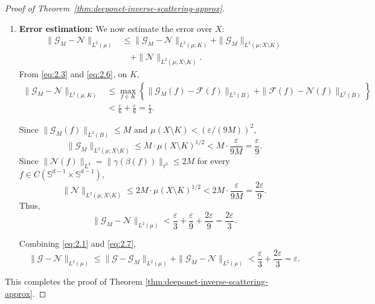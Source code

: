 \documentclass{article}
\numberwithin{equation}{section}
\theoremstyle{plain}
\begin{document}
\begin{proof}[Proof of Theorem~\ref{thm:deeponet-inverse-scattering-approx}]
\begin{enumerate}
			
			\item \textbf{Error estimation:}  
			We now estimate the error over $X$:
			\begin{equation*}
				\begin{aligned}
					\| \mathscr{G}_M - \mathscr{N} \|_{L^2(\mu)} 
					&\leq \| \mathscr{G}_M - \mathscr{N} \|_{L^2(\mu;K)} + \| \mathscr{G}_M \|_{L^2(\mu;X \setminus K)} \\ 
					&\quad + \| \mathscr{N} \|_{L^2(\mu;X \setminus K)}.
				\end{aligned}
			\end{equation*}
			From \eqref{eq:2.3} and \eqref{eq:2.6}, on $K$,
			\begin{equation*}
				\begin{aligned}
					\| \mathscr{G}_M - \mathscr{N} \|_{L^2(\mu;K)} 
					&\leq \max_{f \in K} \left\{ \| \mathscr{G}_M(f) - \mathcal{F}(f) \|_{L^2(B)} + \| \mathcal{F}(f) - \mathscr{N}(f) \|_{L^2(B)} \right\} \\ 
					&< \frac{\varepsilon}{6} + \frac{\varepsilon}{6} = \frac{\varepsilon}{3}.
				\end{aligned} 
			\end{equation*}
			
			
			Since $\|\mathscr{G}_M(f)\|_{L^2(B)} \leq M$ and $\mu(X \setminus K) < (\varepsilon/(9M))^2$,
			\begin{equation*}
				\| \mathscr{G}_M \|_{L^2(\mu;X \setminus K)} \leq M \cdot \mu(X \setminus K)^{1/2} < M \cdot \frac{\varepsilon}{9M} = \frac{\varepsilon}{9}.
			\end{equation*}
			Since $\|\mathscr{N}(f)\|_{L^2} = \|\gamma(\beta(f))\|_{\ell^2} \leq 2M$ for every $f\in C(\mathbb{S}^{d-1}\times\mathbb{S}^{d-1})$,
			\begin{equation*}
				\| \mathscr{N} \|_{L^2(\mu;X \setminus K)} \leq 2M \cdot \mu(X \setminus K)^{1/2} < 2M \cdot \frac{\varepsilon}{9M} = \frac{2\varepsilon}{9}.
			\end{equation*}
			Thus,
			\begin{equation}
				\| \mathscr{G}_M - \mathscr{N} \|_{L^2(\mu)} < \frac{\varepsilon}{3} + \frac{\varepsilon}{9} + \frac{2\varepsilon}{9} = \frac{2\varepsilon}{3}. \label{eq:2.7}
			\end{equation}
			
			Combining \eqref{eq:2.1} and \eqref{eq:2.7},
			\begin{equation*}
				\| \mathscr{G} - \mathscr{N} \|_{L^2(\mu)} \leq \| \mathscr{G} - \mathscr{G}_M \|_{L^2(\mu)} + \| \mathscr{G}_M - \mathscr{N} \|_{L^2(\mu)} < \frac{\varepsilon}{3} + \frac{2\varepsilon}{3} = \varepsilon.
			\end{equation*}
		\end{enumerate}
		This completes the proof of Theorem \ref{thm:deeponet-inverse-scattering-approx}.
	\end{proof}
	
\end{document}
